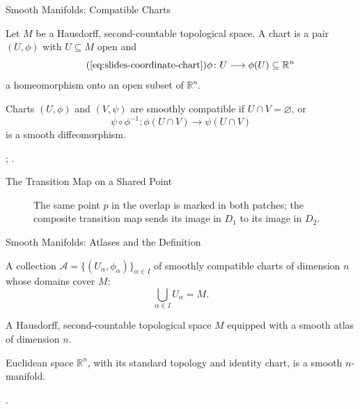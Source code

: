 \documentclass[aspectratio=169,11pt]{beamer}
\newcommand{\sources}[1]{\par\vfill{\scriptsize\color{black!75}#1\par}}
\begin{document}
\begin{frame}{Smooth Manifolds: Compatible Charts}
  \begin{definition}
    Let $M$ be a Hausdorff, second-countable topological space.
    A chart is a pair $(U,\phi)$ with $U\subseteq M$ open and
    \begin{equation*}
      \tag{\ref{eq:slides-coordinate-chart}}
      \phi\colon U\longrightarrow\phi(U)\subseteq\mathbb{R}^n
    \end{equation*}
    a homeomorphism onto an open subset of $\mathbb{R}^n$.
  \end{definition}
  \begin{definition}
    Charts $(U,\phi)$ and $(V,\psi)$ are smoothly compatible if
    $U\cap V=\varnothing$, or
    \begin{equation}
      \psi\circ\phi^{-1}\colon\phi(U\cap V)\longrightarrow\psi(U\cap V)
    \end{equation}
    is a smooth diffeomorphism.
  \end{definition}
  \sources{\cite[Chapter~1, pp.~11--13]{lee2013smooth};
    \cite[Chapter~2]{tu2011introduction}.}
\end{frame}

\begin{frame}{The Transition Map on a Shared Point}
  \begin{figure}
    \centering
    \begingroup
      \def\showtransitionmaps{1}
      \resizebox{0.98\textwidth}{!}{}
    \endgroup
    \caption{The same point $p$ in the overlap is marked in both patches; the
      composite transition map sends its image in $D_1$ to its image in $D_2$.}
    \label{fig:slides-transition-point}
  \end{figure}
\end{frame}

\begin{frame}{Smooth Manifolds: Atlases and the Definition}
  \begin{definition}
    A collection $\mathcal{A}=\{(U_\alpha,\phi_\alpha)\}_{\alpha\in I}$
    of smoothly compatible charts of dimension $n$ whose domains cover $M$:
    \begin{equation}
      \bigcup_{\alpha\in I}U_\alpha=M.
    \end{equation}
  \end{definition}
  \begin{definition}
    A Hausdorff, second-countable topological space $M$ equipped with a
    smooth atlas of dimension $n$.
  \end{definition}
  Euclidean space $\mathbb{R}^n$, with its standard topology and identity chart,
  is a smooth $n$-manifold.
  \sources{\cite[pp.~11--13; Proposition~1.17, p.~13]{lee2013smooth}.}
\end{frame}
\end{document}
